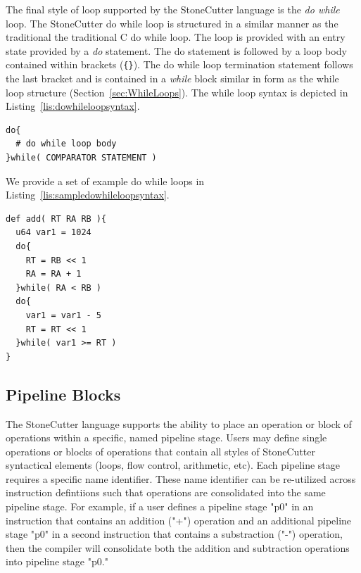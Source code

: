 \documentclass{article}
\begin{document}
The final style of loop supported by the StoneCutter language is the \textit{do while} loop.  The StoneCutter do while 
loop is structured in a similar manner as the traditional the traditional C do while loop.  The loop is provided with 
an entry state provided by a \textit{do} statement.  The do statement is followed by a loop body contained within brackets 
(\texttt{\{\}}).  The do while loop termination statement follows the last bracket and is contained in a \textit{while} block similar 
in form as the while loop structure (Section~\ref{sec:WhileLoops}).  The while loop syntax is depicted in 
Listing~\ref{lis:dowhileloopsyntax}.   

\vspace{0.125in}
\begin{lstlisting}[frame=single,style=base,caption={Do While Loop Syntax},captionpos=b,label={lis:dowhileloopsyntax}]
do{
  # do while loop body
}while( COMPARATOR STATEMENT )
\end{lstlisting}

We provide a set of example do while loops in Listing~\ref{lis:sampledowhileloopsyntax}.

\vspace{0.125in}
\begin{lstlisting}[frame=single,style=base,caption={Sample Do While Loop Syntax},captionpos=b,label={lis:sampledowhileloopsyntax}]
def add( RT RA RB ){
  u64 var1 = 1024
  do{
    RT = RB << 1
    RA = RA + 1
  }while( RA < RB )
  do{
    var1 = var1 - 5
    RT = RT << 1
  }while( var1 >= RT )
}
\end{lstlisting}

\clearpage
\subsection{Pipeline Blocks}
\label{sec:PipelineBlocks}

The StoneCutter language supports the ability to place an operation or block of operations 
within a specific, named pipeline stage.  Users may define single operations or blocks of 
operations that contain all styles of StoneCutter syntactical elements (loops, flow control, arithmetic, etc).  
Each pipeline stage requires a specific name identifier.  These name identifier can be re-utilized across 
instruction defintiions such that operations are consolidated into the same pipeline stage.  For example, 
if a user defines a pipeline stage "p0" in an instruction that contains an addition ("+") 
operation and an additional pipeline stage "p0" in a second instruction that contains a 
substraction ("-") operation, then the compiler will consolidate both the addition and subtraction 
operations into pipeline stage "p0."
\end{document}
